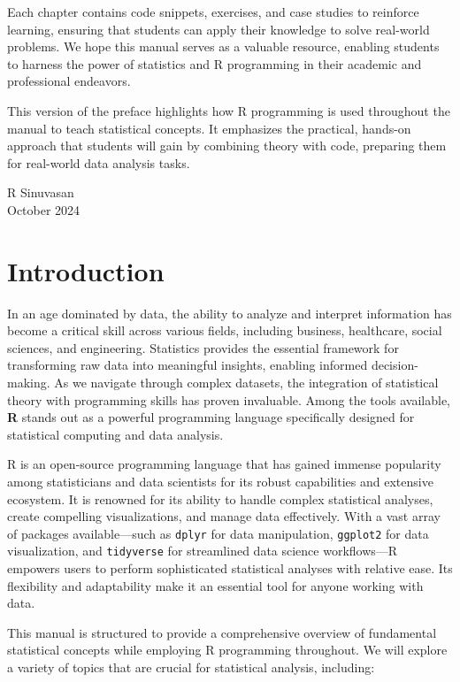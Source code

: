 \documentclass[10pt]{book}
\begin{document}
Each chapter contains code snippets, exercises, and case studies to reinforce learning, ensuring that students can apply their knowledge to solve real-world problems. We hope this manual serves as a valuable resource, enabling students to harness the power of statistics and R programming in their academic and professional endeavors.

This version of the preface highlights how R programming is used throughout the manual to teach statistical concepts. It emphasizes the practical, hands-on approach that students will gain by combining theory with code, preparing them for real-world data analysis tasks.


\vspace{0.5in}
R Sinuvasan \\
October 2024

\newpage

\tableofcontents
\newpage

\chapter{Introduction}

In an age dominated by data, the ability to analyze and interpret information has become a critical skill across various fields, including business, healthcare, social sciences, and engineering. Statistics provides the essential framework for transforming raw data into meaningful insights, enabling informed decision-making. As we navigate through complex datasets, the integration of statistical theory with programming skills has proven invaluable. Among the tools available, \textbf{R} stands out as a powerful programming language specifically designed for statistical computing and data analysis.

R is an open-source programming language that has gained immense popularity among statisticians and data scientists for its robust capabilities and extensive ecosystem. It is renowned for its ability to handle complex statistical analyses, create compelling visualizations, and manage data effectively. With a vast array of packages available—such as \texttt{dplyr} for data manipulation, \texttt{ggplot2} for data visualization, and \texttt{tidyverse} for streamlined data science workflows—R empowers users to perform sophisticated statistical analyses with relative ease. Its flexibility and adaptability make it an essential tool for anyone working with data.

This manual is structured to provide a comprehensive overview of fundamental statistical concepts while employing R programming throughout. We will explore a variety of topics that are crucial for statistical analysis, including:
\end{document}
